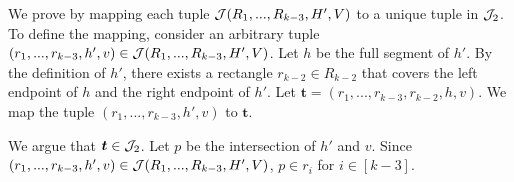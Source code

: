 We prove by mapping each tuple $\mathcal{J}(R_1,...,R_{k-3},H',V)$ to a unique tuple in $\mathcal{J}_2$. 
To define the mapping, consider an arbitrary tuple $(r_1,...,r_{k-3}, h', v) \in \mathcal{J}(R_1,...,R_{k-3},H',V)$. Let $h$ be the full segment of $h'$. By the definition of $h'$, there exists a rectangle $r_{k-2}\in R_{k-2}$ that covers the left endpoint of $h$ and the right endpoint of $h'$. Let $\bm{t} = (r_1,...,r_{k-3}, r_{k-2},h,v)$. We map the tuple $(r_1,...,r_{k-3}, h', v)$ to $\bm{t}$. 

\vgap 

We argue that $\textrm{\boldmath${t}$}\in \mathcal{J}_2$. Let $p$ be the intersection of $h'$ and $v$. Since $(r_1,...,r_{k-3}, h', v) \in \mathcal{J}(R_1,...,R_{k-3},H',V)$, $p \in r_i$ for $i \in [k-3]$.